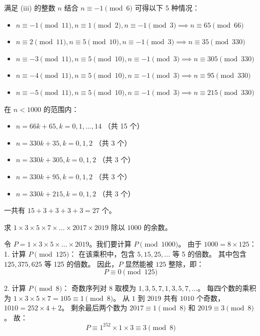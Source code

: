\begin{questions}
\begin{solution}
满足 (iii) 的整数 $n$ 结合 $n \equiv -1 \pmod 6$ 可得以下 5 种情况：
\begin{itemize}
    \item $n \equiv -1 \pmod{11}, n \equiv 1 \pmod 2, n \equiv -1 \pmod 3 \implies n \equiv 65 \pmod{66}$
    \item $n \equiv 2 \pmod{11}, n \equiv 5 \pmod{10}, n \equiv -1 \pmod 3 \implies n \equiv 35 \pmod{330}$
    \item $n \equiv -3 \pmod{11}, n \equiv 5 \pmod{10}, n \equiv -1 \pmod 3 \implies n \equiv 305 \pmod{330}$
    \item $n \equiv -4 \pmod{11}, n \equiv 5 \pmod{10}, n \equiv -1 \pmod 3 \implies n \equiv 95 \pmod{330}$
    \item $n \equiv -5 \pmod{11}, n \equiv 5 \pmod{10}, n \equiv -1 \pmod 3 \implies n \equiv 215 \pmod{330}$
\end{itemize}

在 $n < 1000$ 的范围内：
\begin{itemize}
    \item $n = 66k + 65, k = 0, 1, \dots, 14$ （共 15 个）
    \item $n = 330k + 35, k = 0, 1, 2$ （共 3 个）
    \item $n = 330k + 305, k = 0, 1, 2$ （共 3 个）
    \item $n = 330k + 95, k = 0, 1, 2$ （共 3 个）
    \item $n = 330k + 215, k = 0, 1, 2$ （共 3 个）
\end{itemize}
一共有 $15 + 3 + 3 + 3 + 3 = 27$ 个。
\end{solution}

\question
求 $1 \times 3 \times 5 \times 7 \times \dots \times 2017 \times 2019$ 除以 $1000$ 的余数。

\begin{solution}
令 $P = 1 \times 3 \times 5 \times \dots \times 2019$。我们要计算 $P \pmod{1000}$。
由于 $1000 = 8 \times 125$：
1. 计算 $P \pmod{125}$：
在该乘积中，包含 $5, 15, 25, \dots$ 等 5 的倍数。
其中包含 $125, 375, 625$ 等 125 的倍数。
因此，$P$ 显然能被 $125$ 整除，即：
\[ P \equiv 0 \pmod{125} \]

2. 计算 $P \pmod{8}$：
奇数序列对 8 取模为 $1, 3, 5, 7, 1, 3, 5, 7, \dots$。
每四个数的乘积为 $1 \times 3 \times 5 \times 7 = 105 \equiv 1 \pmod{8}$。
从 $1$ 到 $2019$ 共有 $1010$ 个奇数，$1010 = 252 \times 4 + 2$。
剩余最后两个数为 $2017 \equiv 1 \pmod{8}$ 和 $2019 \equiv 3 \pmod{8}$。
故：
\[ P \equiv 1^{252} \times 1 \times 3 \equiv 3 \pmod{8} \]


\end{solution}
\end{questions}
